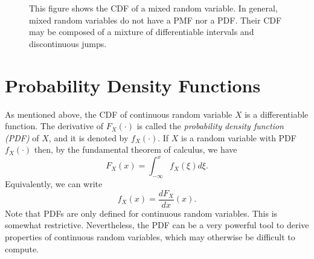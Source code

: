 \begin{figure}[ht]
\begin{center}
\end{center}
\caption{This figure shows the CDF of a mixed random variable.
In general, mixed random variables do not have a PMF nor a PDF.
Their CDF may be composed of a mixture of differentiable intervals and discontinuous jumps.}
\end{figure}


\section{Probability Density Functions}

As mentioned above, the CDF of continuous random variable $X$ is a differentiable function.
The derivative of $F_X (\cdot)$ is called the \emph{probability density function (PDF)} of $X$, and it is denoted by $f_X(\cdot)$. 
If $X$ is a random variable with PDF $f_X (\cdot)$ then, by the fundamental theorem of calculus, we have
\begin{equation*}
F_X (x) = \int_{- \infty}^x f_X (\xi) d\xi .
\end{equation*}
Equivalently, we can write
\begin{equation*}
f_X (x) = \frac{d F_X}{dx} (x) .
\end{equation*}
Note that PDFs are only defined for continuous random variables.
This is somewhat restrictive.
Nevertheless, the PDF can be a very powerful tool to derive properties of continuous random variables, which may otherwise be difficult to compute.

